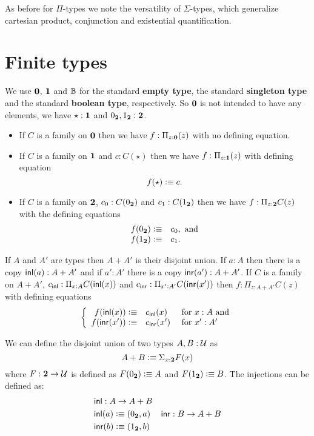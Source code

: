 As before for $\Pi$-types we note the versatility of $\Sigma$-types,
which generalize cartesian product, conjunction and existential
quantification. 

\section{Finite types}
\label{sec:finite-types}



We use $\mathbf{0}$, $\mathbf{1}$ and $\mathbb{B}$ for the standard {\bf empty
  type}, the standard {\bf singleton type} and the standard {\bf
  boolean type}, respectively.  So $\mathbf{0}$ is not intended to have
any elements, we have $\star:\mathbf{1}$ and $0_{\mathbf{2}},1_{\mathbf{2}}:\mathbf{2}$.
\begin{itemize}
\item If $C$ is a family on $\mathbf{0}$ then we have $f:\Pi_{z:\mathbf{0}}(z)$ with no defining equation.
\item If $C$ is a family on $\mathbf{1}$ and $c:C(\star)$ then we have $f:\Pi_{z:\mathbf{1}}(z)$ with defining equation
  \[ f(\star)\vcentcolon\equiv c.\]
\item If $C$ is a family on $\mathbf{2}$, $c_0:C(0_{\mathbf{2}})$ 
and $c_1:C(1_{\mathbf{2}})$ then we have $f:\Pi_{z:\mathbf{2}}C(z)$ with the defining equations
 \[ \begin{array}{rl}
f(0_{\mathbf{2}}) \vcentcolon\equiv& c_0, \mbox{ and}\\
f(1_{\mathbf{2}}) \vcentcolon\equiv& c_1.
  \end{array}\]
\end{itemize}

If $A$ and $A'$ are types then $A+A'$ is their disjoint union.  If
$a:A$ then there is a copy $\mathsf{inl}(a):A+A'$ and if $a':A'$ there is a
copy $\mathsf{inr}(a'):A+A'$.
If $C$ is a family on $A+A'$, $c_\mathsf{inl}:\Pi_{x:A}C(\mathsf{inl}(x))$ and $c_\mathsf{inr}:\Pi_{x':A'}C(\mathsf{inr}(x'))$ then $f:\Pi_{z:A+A'}C(z)$ with defining equations
  \[\left\{\begin{array}{rll} 
f(\mathsf{inl}(x))\vcentcolon\equiv& c_\mathsf{inl}(x)&\mbox{ for } x:A \mbox{ and}\\
f(\mathsf{inr}(x'))\vcentcolon\equiv& c_\mathsf{inr}(x')&\mbox{ for } x':A'\\
\end{array}\right.\]

We can define the disjoint union of two types $A,B:\mathcal{U}$ as
\[A + B \vcentcolon\equiv \Sigma_{x:\mathbf{2}}F(x)\]
where $F : \mathbf{2} \to \mathcal{U}$ is
defined as $F(0_{\mathbf{2}}) \vcentcolon\equiv A$ and $F(1_{\mathbf{2}})\vcentcolon\equiv B$. The
injections can be defined as:
\begin{align*}
& \mathsf{inl} :  A \to A+B\\
& \mathsf{inl}(a) \vcentcolon\equiv (0_{\mathbf{2}},a)
& \mathsf{inr} :  B \to A+B\\
& \mathsf{inr}(b) \vcentcolon\equiv (1_{\mathbf{2}},b)
\end{align*}

